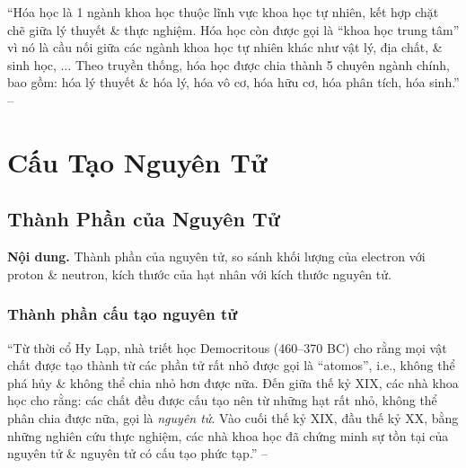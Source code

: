 \documentclass{article}
\numberwithin{equation}{section}
\begin{document}
``Hóa học là 1 ngành khoa học thuộc lĩnh vực khoa học tự nhiên, kết hợp chặt chẽ giữa lý thuyết \& thực nghiệm. Hóa học còn được gọi là ``khoa học trung tâm'' vì nó là cầu nối giữa các ngành khoa học tự nhiên khác như vật lý, địa chất, \& sinh học, $\ldots$ Theo truyền thống, hóa học được chia thành 5 chuyên ngành chính, bao gồm: hóa lý thuyết \& hóa lý, hóa vô cơ, hóa hữu cơ, hóa phân tích, hóa sinh.'' -- \cite[p. 11]{SGK_Hoa_Hoc_10_Chan_Troi_Sang_Tao}


\section{Cấu Tạo Nguyên Tử}

\subsection{Thành Phần của Nguyên Tử}
\textsf{\textbf{Nội dung.} Thành phần của nguyên tử, so sánh khối lượng của electron với proton \& neutron, kích thước của hạt nhân với kích thước nguyên tử.}

\subsubsection{Thành phần cấu tạo nguyên tử}
``Từ thời cổ Hy Lạp, nhà triết học Democritous (460--370 BC) cho rằng mọi vật chất được tạo thành từ các phần tử rất nhỏ được gọi là ``atomos'', i.e., không thể phá hủy \& không thể chia nhỏ hơn được nữa. Đến giữa thế kỷ XIX, các nhà khoa học cho rằng: các chất đều được cấu tạo nên từ những hạt rất nhỏ, không thể phân chia được nữa, gọi là \textit{nguyên tử}. Vào cuối thế kỷ XIX, đầu thế kỷ XX, bằng những nghiên cứu thực nghiệm, các nhà khoa học đã chứng minh sự tồn tại của nguyên tử \& nguyên tử có cấu tạo phức tạp.'' -- \cite[p. 13]{SGK_Hoa_Hoc_10_Chan_Troi_Sang_Tao}
\end{document}

